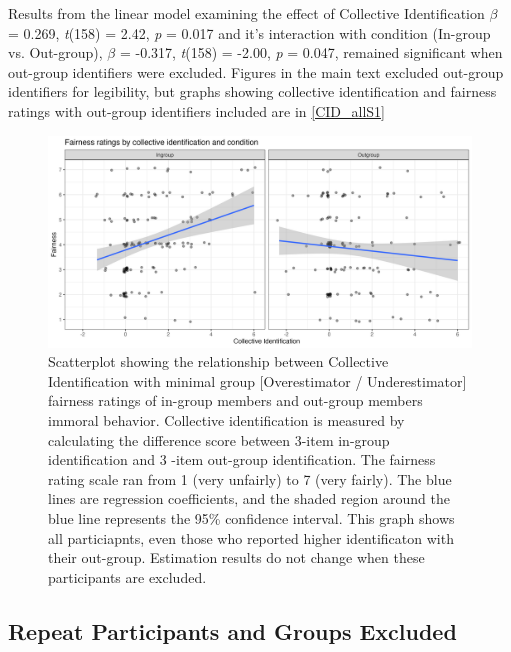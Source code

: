 \documentclass[12pt,]{article}
\begin{document}
\clearpage

Results from the linear model examining the effect of Collective Identification $\beta$ = 0.269, \emph{t}(158) = 2.42, \emph{p} = 0.017 and it's interaction with condition (In-group vs. Out-group), $\beta$ = -0.317, \emph{t}(158) = -2.00, \emph{p} = 0.047, remained significant when out-group identifiers were excluded. Figures in the main text excluded out-group identifiers for legibility, but graphs showing collective identification and fairness ratings with out-group identifiers included are in \cref{CID_allS1}


\begin{figure}
	\centering
	\includegraphics{Plots/Study1_CI_all.png}
	\caption{Scatterplot showing the relationship between Collective Identification with minimal group [Overestimator / Underestimator] fairness ratings of in-group members and out-group members immoral behavior. Collective identification is measured by calculating the difference score between 3-item in-group identification and 3 -item out-group identification. The fairness rating scale ran from 1 (very unfairly) to 7 (very fairly). The blue lines are regression coefficients, and the shaded region around the blue line represents the 95\% confidence interval. This graph shows all particiapnts, even those who reported higher identificaton with their out-group. Estimation results do not change when these participants are excluded. }
	\label{fig:CID_allS1}
\end{figure}



\newpage
\subsection{Repeat Participants and Groups Excluded}
\label{appendix:repeat1}
\end{document}
